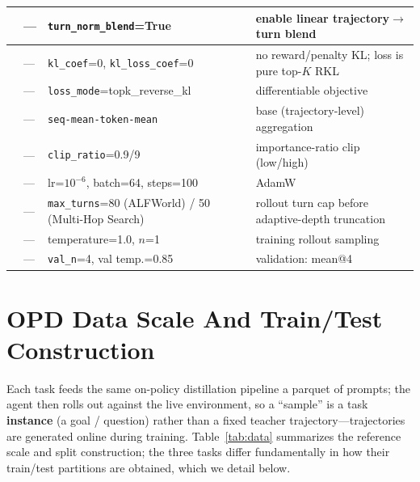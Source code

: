 \begin{table}[tbp]
{\begin{tabular}{@{}>{\centering\arraybackslash}m{2.8cm}>{\centering\arraybackslash}m{2.2cm}>{\centering\arraybackslash}m{5.3cm}>{\centering\arraybackslash}m{6.6cm}@{}}
 & --- & \texttt{turn\_norm\_blend}=True & enable linear trajectory$\to$turn blend \\
\midrule
\multirow{6}{*}{OPD / optimization}
 & --- & \texttt{kl\_coef}=0, \texttt{kl\_loss\_coef}=0 & no reward/penalty KL; loss is pure top-$K$ RKL \\
 & --- & \texttt{loss\_mode}=topk\_reverse\_kl & differentiable objective \\
 & --- & \texttt{seq-mean-token-mean} & base (trajectory-level) aggregation \\
 & --- & \texttt{clip\_ratio}=0.9/9 & importance-ratio clip (low/high) \\
 & --- & lr=$10^{-6}$, batch=64, steps=100 & AdamW \\
\midrule
\multirow{3}{*}{Rollout / eval}
 & --- & \texttt{max\_turns}=80 (ALFWorld) / 50 (Multi-Hop Search) & rollout turn cap before adaptive-depth truncation \\
 & --- & temperature=1.0, $n$=1 & training rollout sampling \\
 & --- & \texttt{val\_n}=4, val temp.=0.85 & validation: mean@4 \\
\bottomrule
\end{tabular}
}
\end{table}

\FloatBarrier

\section{OPD Data Scale And Train/Test Construction}
\label{app:data}

Each task feeds the same on-policy distillation pipeline a parquet of prompts; the
agent then rolls out against the live environment, so a ``sample'' is a task
\textbf{instance} (a goal / question) rather than a fixed teacher trajectory---trajectories
are generated online during training. Table~\ref{tab:data} summarizes the reference
scale and split construction; the three tasks differ fundamentally in how their
train/test partitions are obtained, which we detail below.

